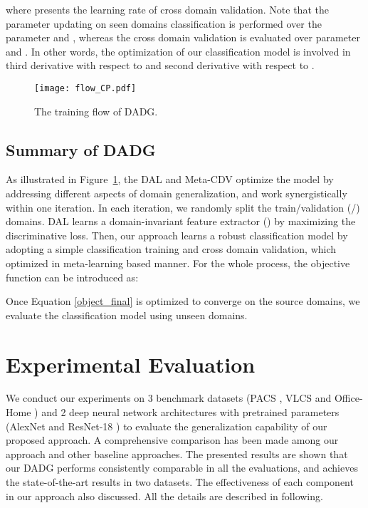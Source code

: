 \documentclass[twocolumn,preprint]{elsarticle}
\begin{document}
where  presents the learning rate of cross domain validation.
Note that the parameter updating on seen domains classification is performed over the parameter  and , whereas the cross domain validation is evaluated over parameter  and . In other words, the optimization of our classification model is involved in third derivative with respect to  and second derivative with respect to . 

\begin{figure}[t]
  \centering
  \texttt{[image: flow\_CP.pdf]}
  \caption{The training flow of DADG.}
  \label{flow}
\end{figure}

\subsection{Summary of DADG} \label{approachsummary}
As illustrated in Figure~\ref{flow}, the DAL and Meta-CDV optimize the model by addressing different aspects of domain generalization, and work synergistically within one iteration. In each iteration, we randomly split the train/validation (/) domains. DAL learns a domain-invariant feature extractor (\textit{}) by maximizing the discriminative loss. Then, our approach learns a robust classification model by adopting a simple classification training and cross domain validation, which optimized in meta-learning based manner.
For the whole process, the objective function can be introduced as: 


Once Equation \ref{object_final} is optimized to converge on the source domains, we evaluate the classification model using unseen domains.



\section{Experimental Evaluation} \label{section:exp}
We conduct our experiments on 3 benchmark datasets (PACS \cite{tf}, VLCS \cite{VLCS} and Office-Home \cite{office-home}) and 2 deep neural network architectures with pretrained parameters (AlexNet \cite{krizhevsky2012imagenet} and ResNet-18 \cite{he2016deep}) to evaluate the generalization capability of our proposed approach. A comprehensive comparison has been made among our approach and other baseline approaches.
The presented results are shown that our DADG performs consistently comparable in all the evaluations, and achieves the state-of-the-art results in two datasets. The effectiveness of each component in our approach also discussed. All the details are described in following.
\end{document}
